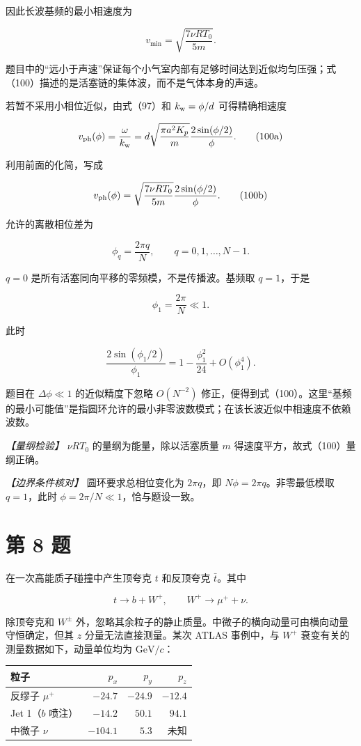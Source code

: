 \documentclass[12pt,a4paper,UTF8]{ctexart}
\begin{document}
因此长波基频的最小相速度为

\[\boxed{v_{\min}=\sqrt{\frac{7\nu RT_0}{5m}}}. \tag{100}\]

题目中的``远小于声速''保证每个小气室内部有足够时间达到近似均匀压强；式（100）描述的是活塞链的集体波，而不是气体本身的声速。

若暂不采用小相位近似，由式（97）和 \(k_{\rm w}=\phi/d\) 可得精确相速度

\[v_{\rm ph}(\phi)
=\frac{\omega}{k_{\rm w}}
=d\sqrt{\frac{\pi a^2K_p}{m}}
\frac{2\sin(\phi/2)}{\phi}. \tag{100a}\]

利用前面的化简，写成

\[v_{\rm ph}(\phi)
=\sqrt{\frac{7\nu RT_0}{5m}}
\frac{2\sin(\phi/2)}{\phi}. \tag{100b}\]

允许的离散相位差为

\[\phi_q=\frac{2\pi q}{N},\qquad q=0,1,\ldots,N-1.\]

\(q=0\) 是所有活塞同向平移的零频模，不是传播波。基频取 \(q=1\)，于是

\[\phi_1=\frac{2\pi}{N}\ll1.\]

此时

\[\frac{2\sin(\phi_1/2)}{\phi_1}
=1-\frac{\phi_1^2}{24}+O(\phi_1^4).\]

题目在 \(\Delta\phi\ll1\) 的近似精度下忽略 \(O(N^{-2})\)
修正，便得到式（100）。这里``基频的最小可能值''是指圆环允许的最小非零波数模式；在该长波近似中相速度不依赖波数。

\emph{【量纲检验】} \(\nu RT_0\) 的量纲为能量，除以活塞质量 \(m\)
得速度平方，故式（100）量纲正确。

\emph{【边界条件核对】} 圆环要求总相位变化为 \(2\pi q\)，即
\(N\phi=2\pi q\)。非零最低模取 \(q=1\)，此时
\(\phi=2\pi/N\ll1\)，恰与题设一致。

\newpage

\section{第 8 题}\label{ux7b2c-8-ux9898}

在一次高能质子碰撞中产生顶夸克 \(t\) 和反顶夸克 \(\bar t\)。其中

\[t\to b+W^+,\qquad W^+\to\mu^++\nu.\]

除顶夸克和 \(W^\pm\)
外，忽略其余粒子的静止质量。中微子的横向动量可由横向动量守恒确定，但其
\(z\) 分量无法直接测量。某次 ATLAS 事例中，与 \(W^+\)
衰变有关的测量数据如下，动量单位均为 \(\mathrm{GeV}/c\)：

\begin{center}
\begin{tabular}{lrrr}
\toprule
粒子 & $p_x$ & $p_y$ & $p_z$ \\
\midrule
反缪子 $\mu^+$ & $-24.7$ & $-24.9$ & $-12.4$ \\
Jet 1（$b$ 喷注） & $-14.2$ & $50.1$ & $94.1$ \\
中微子 $\nu$ & $-104.1$ & $5.3$ & 未知 \\
\bottomrule
\end{tabular}
\end{center}
\end{document}
